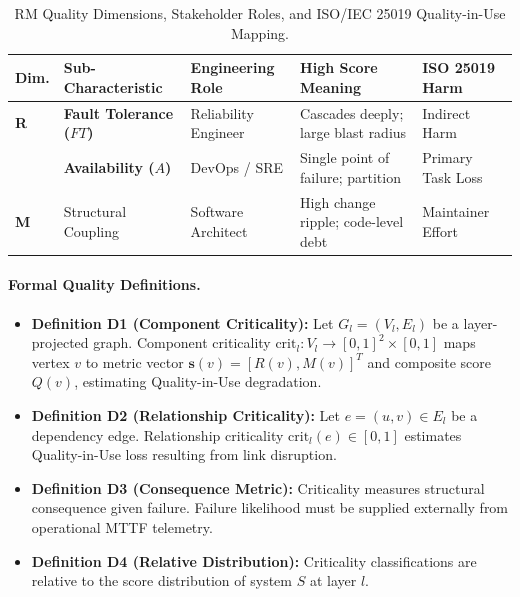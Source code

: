 \begin{table}[htbp]
\centering
\small
\setlength{\tabcolsep}{4pt}
\caption{RM Quality Dimensions, Stakeholder Roles, and ISO/IEC 25019 Quality-in-Use Mapping.}
\label{tab:rm_stakeholders}
\begin{tabularx}{\textwidth}{l>{\raggedright\arraybackslash}p{2.6cm}>{\raggedright\arraybackslash}p{2.4cm}X>{\raggedright\arraybackslash}p{2.4cm}}
\toprule
\textbf{Dim.} & \textbf{Sub-Characteristic} & \textbf{Engineering Role} & \textbf{High Score Meaning} & \textbf{ISO 25019 Harm} \\
\midrule
\textbf{R} & \textbf{Fault Tolerance ($FT$)} & Reliability Engineer & Cascades deeply; large blast radius & Indirect Harm \\
& \textbf{Availability ($A$)} & DevOps / SRE & Single point of failure; partition & Primary Task Loss \\
\textbf{M} & Structural Coupling & Software Architect & High change ripple; code-level debt & Maintainer Effort \\
\bottomrule
\end{tabularx}
\end{table}

\paragraph{Formal Quality Definitions.}
\begin{itemize}
    \item \textbf{Definition D1 (Component Criticality):} Let $G_l = (V_l, E_l)$ be a layer-projected graph. Component criticality $\mathrm{crit}_l : V_l \to [0,1]^2 \times [0,1]$ maps vertex $v$ to metric vector $\mathbf{s}(v) = [R(v), M(v)]^T$ and composite score $Q(v)$, estimating Quality-in-Use degradation.
    \item \textbf{Definition D2 (Relationship Criticality):} Let $e = (u,v) \in E_l$ be a dependency edge. Relationship criticality $\mathrm{crit}_l(e) \in [0,1]$ estimates Quality-in-Use loss resulting from link disruption.
    \item \textbf{Definition D3 (Consequence Metric):} Criticality measures structural consequence given failure. Failure likelihood must be supplied externally from operational MTTF telemetry.
    \item \textbf{Definition D4 (Relative Distribution):} Criticality classifications are relative to the score distribution of system $S$ at layer $l$.
\end{itemize}

